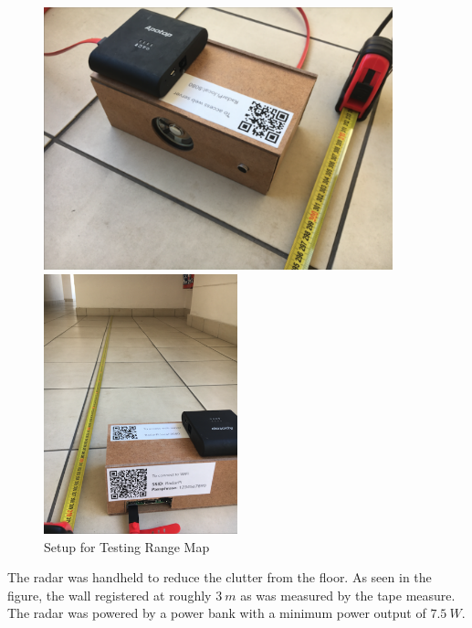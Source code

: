 \begin{figure}[h!]
    \centering
    {\begin{minipage}{0.45\textwidth}
        \centering
        \includegraphics[width=0.9\textwidth]{images/test.pdf}
    \end{minipage}\hfill
    \begin{minipage}{0.45\textwidth}
        \centering
        \includegraphics[width = 0.5\textwidth]{images/test1.pdf}
    \end{minipage}}\caption{Setup for Testing Range Map}\label{fig:setup}
\end{figure}

The radar was handheld to reduce the clutter from the floor. As seen in the figure, the wall registered at roughly $3\ m$ as was measured by the tape measure. The radar was powered by a power bank with a minimum power output of $7.5\ W$.

